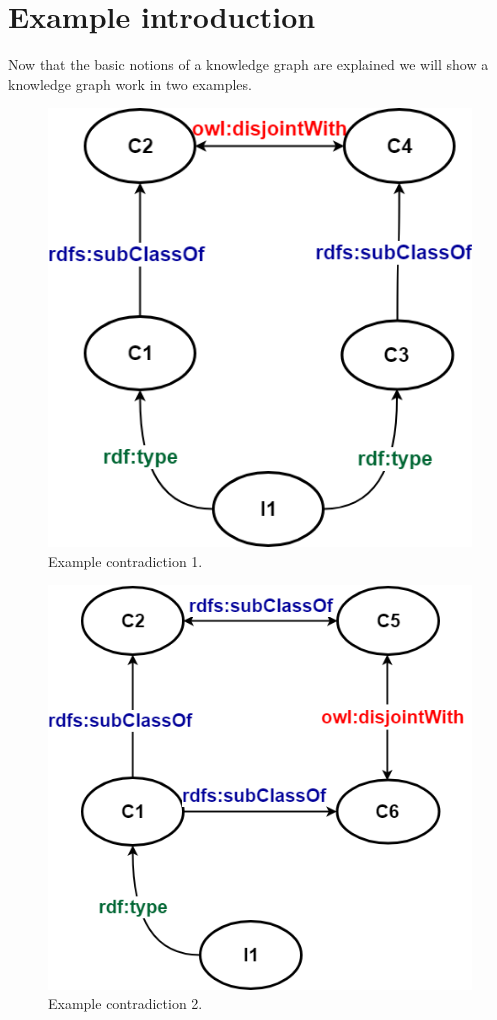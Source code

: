 \documentclass[11pt,letterpaper ,oneside ]{book}
\begin{document}
	\section{Example introduction}
	Now that the basic notions of a knowledge graph are explained we will show a knowledge graph work in two examples. 
	\begin{figure}
		\centering
		\includegraphics[width=\linewidth]{images/Example1.png}
		\caption{Example contradiction 1.}
		\label{fig:Example1}
	\end{figure}
	\begin{figure}
		\centering
		\includegraphics[width=\linewidth]{images/Example2.png}
		\caption{Example contradiction 2.}
		\label{fig:Example2}
	\end{figure}
	
\end{document}
